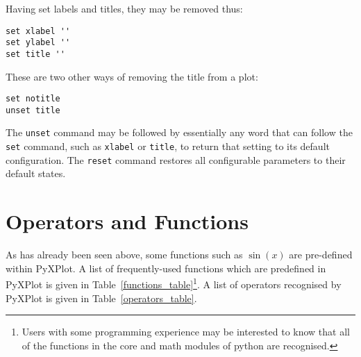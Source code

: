 \documentclass[a4paper,onecolumn,11pt]{book}
\begin{document}
Having set labels and titles, they may be removed thus:

\begin{verbatim}
set xlabel ''
set ylabel ''
set title ''
\end{verbatim}

\noindent These are two other ways of removing the title from a plot:

\begin{verbatim}
set notitle
unset title
\end{verbatim}

The \texttt{unset} command may be
followed by essentially any word that can follow the \texttt{set} command, such
as \texttt{xlabel} or \texttt{title}, to return that setting to its default
configuration. The \texttt{reset} command restores all configurable parameters to their default states.

\section{Operators and Functions}

As has already been seen above, some functions such as $\sin(x)$ are
pre-defined within PyXPlot. A list of frequently-used functions which are
predefined in PyXPlot is given in Table~\ref{functions_table}\footnote{Users
with some programming experience may be interested to know that all of the
functions in the core and math modules of python are recognised.}. A list of
operators recognised by PyXPlot is given in Table~\ref{operators_table}.
\end{document}

